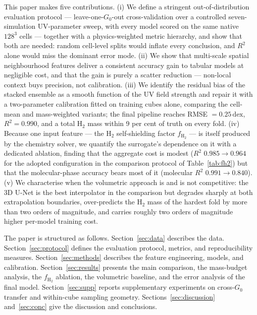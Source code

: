 \documentclass[fleqn,usenatbib]{rasti}
\newcommand{\Gzero}{G_0}
\newcommand{\fshield}{f_{\mathrm{H_2}}}
\newcommand{\dex}{\,\text{dex}}
\newcommand{\Rsq}{R^2}
\begin{document}
This paper makes five contributions. (i) We define a stringent
out-of-distribution evaluation protocol --- leave-one-\(\Gzero\)-out
cross-validation over a controlled seven-simulation UV-parameter sweep,
with every model scored on the same native \(128^3\) cells --- together
with a physics-weighted metric hierarchy, and show that both are needed:
random cell-level splits would inflate every conclusion, and \(\Rsq\)
alone would miss the dominant error mode. (ii) We show that multi-scale
spatial neighbourhood features deliver a consistent accuracy gain to
tabular models at negligible cost, and that the gain is purely a
scatter reduction --- non-local context buys precision, not calibration.
(iii) We identify the residual bias of the stacked ensemble as a smooth
function of the UV field strength and repair it with a two-parameter
calibration fitted on training cubes alone, comparing the cell-mean and
mass-weighted variants; the final pipeline reaches RMSE \(= 0.25\dex\),
\(\Rsq = 0.990\), and a total H\(_2\) mass within 9 per cent of truth on
every fold. (iv) Because one input feature --- the H\(_2\) self-shielding
factor \(\fshield\) --- is itself produced by the chemistry solver, we
quantify the surrogate's dependence on it with a dedicated ablation,
finding that the aggregate cost is modest (\(\Rsq\)
\(0.985 \rightarrow 0.964\) for the adopted configuration in the
comparison protocol of Table~\ref{tab:fh2}) but that the
molecular-phase accuracy bears most of it (molecular \(\Rsq\)
\(0.991 \rightarrow 0.840\)). (v) We characterise when the volumetric
approach is and is not competitive: the 3D U-Net is the best
interpolator in the comparison but degrades sharply at both
extrapolation boundaries, over-predicts the H\(_2\) mass of the hardest
fold by more than two orders of magnitude, and carries roughly two
orders of magnitude higher per-model training cost.

The paper is structured as follows. Section~\ref{sec:data} describes the
data. Section~\ref{sec:protocol} defines the evaluation protocol,
metrics, and reproducibility measures. Section~\ref{sec:methods}
describes the feature engineering, models, and calibration.
Section~\ref{sec:results} presents the main comparison, the mass-budget
analysis, the \(\fshield\) ablation, the volumetric baseline, and the
error analysis of the final model. Section~\ref{sec:supp} reports
supplementary experiments on cross-\(\Gzero\) transfer and within-cube
sampling geometry. Sections~\ref{sec:discussion} and~\ref{sec:conc} give
the discussion and conclusions.
\end{document}
